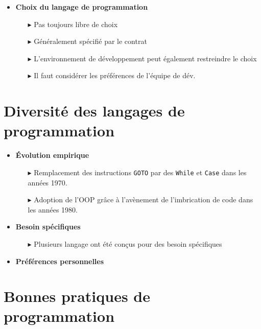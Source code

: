 \documentclass[16pt]{report}
\begin{document}
\begin{multicols*}{2}
    \begin{itemize}
        \item \textbf{Choix du langage de programmation}  
        \begin{itemize}
            \item[$\blacktriangleright$] Pas toujours libre de choix 
            \item[$\blacktriangleright$] Généralement spécifié par le contrat
            \item[$\blacktriangleright$] L'environnement de développement peut également restreindre le choix 
            \item[$\blacktriangleright$] Il faut considérer les préférences de l'équipe de dév. 
        \end{itemize}
    \end{itemize}

    \section{Diversité des langages de programmation}


    \begin{itemize}
        \item \textbf{Évolution empirique}  
            \begin{itemize}
                \item[$\blacktriangleright$] Remplacement des instructions \texttt{GOTO} par des 
                    \texttt{While} et \texttt{Case} dans les années 1970.     
                \item[$\blacktriangleright$] Adoption de l'OOP grâce à l'avènement de l'imbrication de code 
                    dans les années 1980.
            \end{itemize}
        \item \textbf{Besoin spécifiques}  
            \begin{itemize}
                \item[$\blacktriangleright$] Plusieurs langage ont été conçus pour des besoin spécifiques 
            \end{itemize}
        \item \textbf{Préférences personnelles}  
    \end{itemize}

        \section{Bonnes pratiques de programmation}


\end{multicols*}
\end{document}
